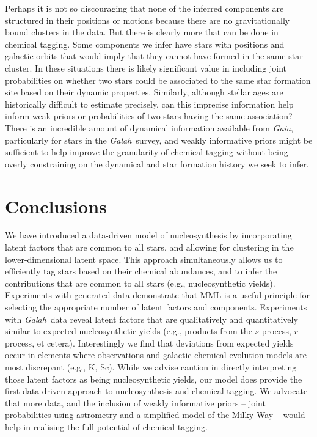 \documentclass[twocolumn]{aastex62}
\newcommand{\project}[1]{\textsl{#1}}
\newcommand{\Galah}{\project{Galah}}
\begin{document}
Perhaps it is not so discouraging that none of the inferred components are structured in their positions or motions because there are no gravitationally bound clusters in the data. But there is clearly more that can be done in chemical tagging. Some components we infer have stars with positions and galactic orbits that would imply that they cannot have formed in the same star cluster. In these situations there is likely significant value in including joint probabilities on whether two stars could be associated to the same star formation site based on their dynamic properties. Similarly, although stellar ages are historically difficult to estimate precisely, can this imprecise information help inform weak priors or probabilities of two stars having the same association? There is an incredible amount of dynamical information available from \project{Gaia}, particularly for stars in the \Galah\ survey, and weakly informative priors might be sufficient to help improve the granularity of chemical tagging without being overly constraining on the dynamical and star formation history we seek to infer.



\section{Conclusions} \label{sec:conclusions}

We have introduced a data-driven model of nucleosynthesis by incorporating 
latent factors that are common to all stars, and allowing for clustering in the
lower-dimensional latent space. This approach simultaneously allows us to efficiently
tag stars based on their chemical abundances, and to infer the contributions that are
common to all stars (e.g., nucleosynthetic yields). Experiments with generated data
demonstrate that MML is a useful principle for selecting the appropriate number of
latent factors and components. Experiments with \Galah\ data reveal latent factors
that are qualitatively and quantitatively similar to expected nucleosynthetic yields (e.g., products
from the $s$-process, $r$-process, et cetera). Interestingly we find that deviations from
expected yields occur in elements where observations and galactic chemical evolution models
are most discrepant (e.g., K, Sc). While we advise caution in directly interpreting
those latent factors as being nucleosynthetic yields, our
model does provide the first data-driven approach to nucleosynthesis and chemical tagging. We advocate that more data, and the inclusion of weakly informative priors -- joint probabilities using astrometry and a simplified model of the Milky Way -- would help in realising the full potential of chemical tagging.
\end{document}

